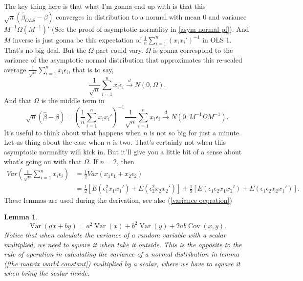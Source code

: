 \documentclass[11pt,a4paper]{amsart}
\theoremstyle{plain}
\newtheorem{lemma}{Lemma}
\theoremstyle{definition}
\begin{document}
   		 	The key thing here is that what I'm gonna end up with is that this $\sqrt{n}(\hat{\beta}_{OLS} - \beta)$ converges in distribution to a normal with mean $0$ and variance $M^{-1}\Omega (M^{-1})'$ (See the proof of asymptotic normality in \ref{asym normal pf}). And $M$ inverse is just gonna be this expectation of $\frac{1}{n}\sum_{i=1}^{n} (x_{i}x_{i}')^{-1}$ in OLS 1. That's no big deal.  But the $\Omega$ part could vary. $\Omega$ is gonna correspond to the variance of the asymptotic normal distribution that approximates this re-scaled average $\frac{1}{\sqrt{n}}\sum_{i=1}^{n}x_{i}\epsilon_{i}$, that is to say, 
   		 	\[	\frac{1}{\sqrt{n}}\sum_{i=1}^{n}x_{i}\epsilon_{i} \stackrel{d}{\longrightarrow} N(0,\Omega).	\] And that $\Omega$ is the middle term in 
   		 	\begin{equation}\label{normality general case}
	   		 	\sqrt{n} (\hat{\beta} - \beta) = (\frac{1}{n}\sum_{i=1}^{n} x_{i}x_{i}')^{-1} \frac{1}{\sqrt{n}} \sum_{i=1}^{n} x_{i}\epsilon_{i} \stackrel{d}{\longrightarrow} N(0,M^{-1}\Omega M^{-1}). 
   		 	\end{equation}
   		 	It's useful to think about what happens when $n$ is not so big for just a minute. Let us thing about the case when $n$ is two.  That's certainly not when this asymptotic normality will kick in. But it'll give you a little bit of a sense about what's going on with that $\Omega$. If $n = 2$, then 
   		 	\[	\begin{aligned}
	   		 	Var(\frac{1}{\sqrt{n}}\sum_{i=1}^{n}x_{i}\epsilon_{i}) &= \frac{1}{2} Var(x_{1}\epsilon_{1} + x_{2}\epsilon_{2}) \\
   		 	 &= \frac{1}{2} [E(\epsilon_{1}^{2}x_{1}x_{1}') + E(\epsilon_{2}^{2}x_{2}x_{2}') ] + \frac{1}{2}[E(\epsilon_{1} \epsilon_{2} x_{1}x_{2}') + E(\epsilon_{1} \epsilon_{2} x_{2}x_{1}')].
   		 	\end{aligned}	\]
   		 	These lemmas are used during the derivation, see also (\ref{variance oepration})
   		 	\begin{lemma}
   		 				\[	\operatorname{Var}(a x+b y)=a^{2} \operatorname{Var}(x)+b^{2} \operatorname{Var}(y)+2 a b \operatorname{Cov}(x, y).	\]
   		 				Notice that when calculate the variance of a random variable with a scalar multiplied, we need to square it when take it outside. This is the opposite to the rule of operation in calculating the variance of a normal distribution in lemma (\ref{the matrix world constant}) multiplied by a scalar, where we have to square it when bring the scalar inside. 
   		 	\end{lemma}
   		 	
\end{document}
